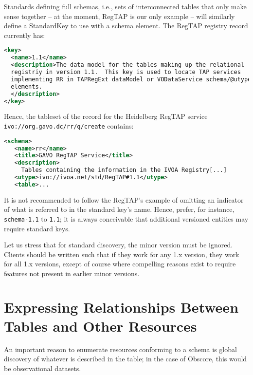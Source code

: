\documentclass[11pt,a4paper]{ivoa}
\begin{document}
Standards defining full schemas, i.e., sets of interconnected tables
that only make sense together -- at the moment, RegTAP is our only
example -- will similarly define a StandardKey to use with a schema
element.  The RegTAP registry record currently has:

\begin{lstlisting}[language=XML]
<key>
  <name>1.1</name>
  <description>The data model for the tables making up the relational
  registriy in version 1.1.  This key is used to locate TAP services
  implementing RR in TAPRegExt dataModel or VODataService schema/@utype
  elements.
  </description>
</key>
\end{lstlisting}

Hence, the tableset of the record for the Heidelberg RegTAP service
\nolinkurl{ivo://org.gavo.dc/rr/q/create} contains:

\begin{lstlisting}[language=XML]
<schema>
   <name>rr</name>
   <title>GAVO RegTAP Service</title>
   <description>
     Tables containing the information in the IVOA Registry[...]
   <utype>ivo://ivoa.net/std/RegTAP#1.1</utype>
   <table>...
\end{lstlisting}

It is not recommended to follow the RegTAP's example of omitting an
indicator of what is referred to in the standard key's name.  Hence,
prefer, for instance, \verb|schema-1.1| to \verb|1.1|; it is always
conceivable that additional versioned entities may require standard
keys.

Let us stress that for standard discovery, the minor
version must be ignored.  Clients should be written such that if they
work for any 1.x version, they work for all 1.x versions, except of
course where compelling reasons exist to require features not present in
earlier minor versions.


\section{Expressing Relationships Between Tables and Other Resources}
\label{sect:rels}

An important reason to enumerate resources conforming to a schema is
global discovery of whatever is described in the table; in the case of
Obscore, this would be observational datasets.
\end{document}
